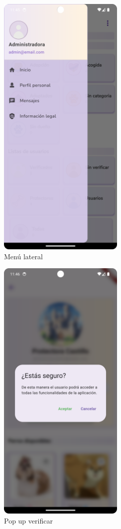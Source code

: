 \documentclass[a4paper, 12pt]{article}
\begin{document}
\begin{figure}[H]
	\begin{center}
		{\includegraphics[width=6cm]{app/AdminDrawer.png}\par}
		\caption{Menú lateral}
	\end{center}
\end{figure}

\begin{figure}[H]
	\begin{center}
		{\includegraphics[width=6cm]{app/AdminVerifyPopUp}\par}
		\caption{Pop up verificar}
	\end{center}
\end{figure}
\end{document}
